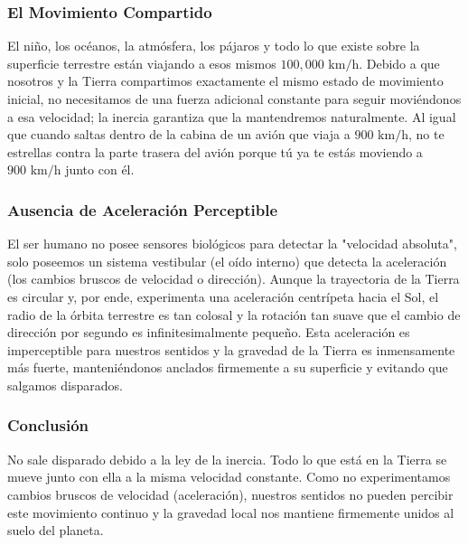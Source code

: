 \documentclass[12pt,letterpaper]{article}
\begin{document}
\subsubsection*{El Movimiento Compartido}
El niño, los océanos, la atmósfera, los pájaros y todo lo que existe sobre la superficie terrestre están viajando a esos mismos $100,000\text{ km/h}$. Debido a que nosotros y la Tierra compartimos exactamente el mismo estado de movimiento inicial, no necesitamos de una fuerza adicional constante para seguir moviéndonos a esa velocidad; la inercia garantiza que la mantendremos naturalmente. Al igual que cuando saltas dentro de la cabina de un avión que viaja a $900\text{ km/h}$, no te estrellas contra la parte trasera del avión porque tú ya te estás moviendo a $900\text{ km/h}$ junto con él.

\subsubsection*{Ausencia de Aceleración Perceptible}
El ser humano no posee sensores biológicos para detectar la "velocidad absoluta", solo poseemos un sistema vestibular (el oído interno) que detecta la aceleración (los cambios bruscos de velocidad o dirección). Aunque la trayectoria de la Tierra es circular y, por ende, experimenta una aceleración centrípeta hacia el Sol, el radio de la órbita terrestre es tan colosal y la rotación tan suave que el cambio de dirección por segundo es infinitesimalmente pequeño. Esta aceleración es imperceptible para nuestros sentidos y la gravedad de la Tierra es inmensamente más fuerte, manteniéndonos anclados firmemente a su superficie y evitando que salgamos disparados.

\subsubsection*{Conclusión}
No sale disparado debido a la ley de la inercia. Todo lo que está en la Tierra se mueve junto con ella a la misma velocidad constante. Como no experimentamos cambios bruscos de velocidad (aceleración), nuestros sentidos no pueden percibir este movimiento continuo y la gravedad local nos mantiene firmemente unidos al suelo del planeta.

\newpage
\end{document}

